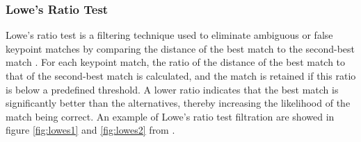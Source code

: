 \subsubsection{Lowe's Ratio Test}

Lowe's ratio test is a filtering technique used to eliminate ambiguous or false keypoint matches by comparing the distance of the best match to the second-best match \cite{bian2020gms}. For each keypoint match, the ratio of the distance of the best match to that of the second-best match is calculated, and the match is retained if this ratio is below a predefined threshold. A lower ratio indicates that the best match is significantly better than the alternatives, thereby increasing the likelihood of the match being correct. An example of Lowe's ratio test filtration are showed in figure \ref{fig:lowes1} and \ref {fig:lowes2} from \cite{bian2020gms}. 


